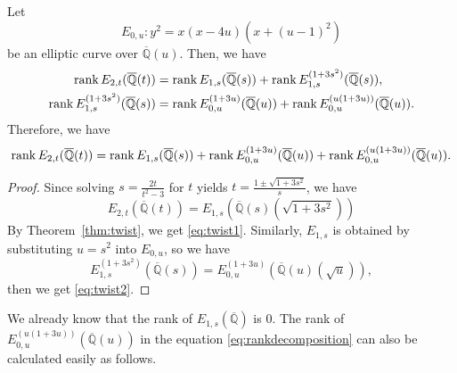 \documentclass[main]{subfiles}
\begin{document}
\begin{thm}
    Let
    \begin{equation*}
        E_{0,u}: y^{2} = x(x - 4u)(x + (u - 1)^{2})
    \end{equation*}
    be an elliptic curve over $\overline{\mathbb{Q}}(u)$.
    Then, we have
    \begin{align}
        \operatorname{rank} E_{2,t}(\overline{\mathbb{Q}}(t))                & = \operatorname{rank} E_{1,s}(\overline{\mathbb{Q}}(s)) + \operatorname{rank} E_{1,s}^{(1 + 3s^{2})}(\overline{\mathbb{Q}}(s)), \label{eq:twist1}           \\
        \operatorname{rank} E_{1,s}^{(1 + 3s^{2})}(\overline{\mathbb{Q}}(s)) & = \operatorname{rank} E_{0,u}^{(1 + 3u)}(\overline{\mathbb{Q}}(u)) + \operatorname{rank} E_{0,u}^{(u(1 + 3u))}(\overline{\mathbb{Q}}(u)). \label{eq:twist2}
    \end{align}
    Therefore, we have
    \begin{equation}
        \label{eq:rankdecomposition}
        \operatorname{rank} E_{2,t}(\overline{\mathbb{Q}}(t)) = \operatorname{rank} E_{1,s}(\overline{\mathbb{Q}}(s)) + \operatorname{rank} E_{0,u}^{(1 + 3u)}(\overline{\mathbb{Q}}(u)) + \operatorname{rank} E_{0,u}^{(u(1 + 3u))}(\overline{\mathbb{Q}}(u)).
    \end{equation}
\end{thm}
\begin{proof}
    Since solving $s = \frac{2t}{t^{2} - 3}$ for $t$ yields $t = \frac{1 \pm \sqrt{1 + 3s^{2}}}{s}$, we have
    \begin{equation*}
        E_{2,t}(\overline{\mathbb{Q}}(t)) = E_{1,s}(\overline{\mathbb{Q}}(s)(\sqrt{1 + 3s^{2}}))
    \end{equation*}
    By Theorem~\ref{thm:twist}, we get \eqref{eq:twist1}.
    Similarly, $E_{1,s}$ is obtained by substituting $u = s^{2}$ into $E_{0,u}$, so we have
    \begin{equation*}
        E_{1,s}^{(1 + 3s^{2})}(\overline{\mathbb{Q}}(s)) = E_{0,u}^{(1 + 3u)}(\overline{\mathbb{Q}}(u)(\sqrt{u})),
    \end{equation*}
    then we get \eqref{eq:twist2}.
\end{proof}

We already know that the rank of $E_{1,s}(\overline{\mathbb{Q}})$ is $0$.
The rank of $E_{0,u}^{(u(1 + 3u))}(\overline{\mathbb{Q}}(u))$ in the equation \eqref{eq:rankdecomposition} can also be calculated easily as follows.
\end{document}
